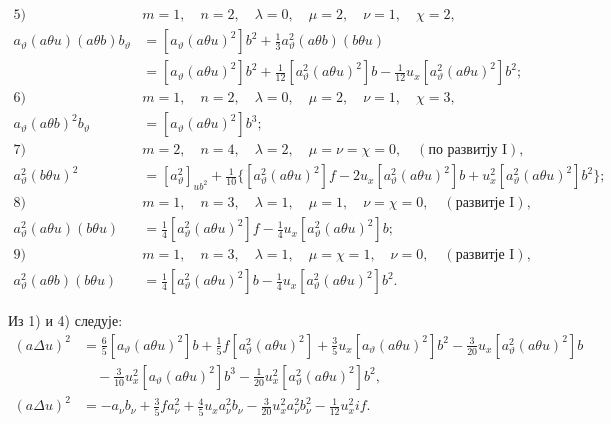 ﻿\documentclass[11pt]{article}
\begin{document}
\begin{align*}
\text{5)}\quad&m=1,\quad n=2,\quad \lambda=0,\quad \mu=2,\quad \nu=1,\quad \chi=2,\\
a_\vartheta(a\theta u)(a\theta b)b_\vartheta
&=[a_\vartheta(a\theta u)^2]b^2+\frac13a_\vartheta^2(a\theta b)(b\theta u)\\
&=[a_\vartheta(a\theta u)^2]b^2+\frac1{12}[a_\vartheta^2(a\theta u)^2]b-\frac1{12}u_x[a_\vartheta^2(a\theta u)^2]b^2;\\[.6em]
\text{6)}\quad&m=1,\quad n=2,\quad \lambda=0,\quad \mu=2,\quad \nu=1,\quad \chi=3,\\
a_\vartheta(a\theta b)^2b_\vartheta&=[a_\vartheta(a\theta u)^2]b^3;\\[.6em]
\text{7)}\quad&m=2,\quad n=4,\quad \lambda=2,\quad \mu=\nu=\chi=0,\quad (\text{по развитју I}),\\
a_\vartheta^2(b\theta u)^2&=[a_\vartheta^2]_{ub^2}+\frac1{10}\{[a_\vartheta^2(a\theta u)^2]f-2u_x[a_\vartheta^2(a\theta u)^2]b+u_x^2[a_\vartheta^2(a\theta u)^2]b^2\};\\[.6em]
\text{8)}\quad&m=1,\quad n=3,\quad \lambda=1,\quad \mu=1,\quad \nu=\chi=0,\quad (\text{развитје I}),\\
a_\vartheta^2(a\theta u)(b\theta u)&=\frac14[a_\vartheta^2(a\theta u)^2]f-\frac14u_x[a_\vartheta^2(a\theta u)^2]b;\\[.6em]
\text{9)}\quad&m=1,\quad n=3,\quad \lambda=1,\quad \mu=\chi=1,\quad \nu=0,\quad (\text{развитје I}),\\
a_\vartheta^2(a\theta b)(b\theta u)&=\frac14[a_\vartheta^2(a\theta u)^2]b-\frac14u_x[a_\vartheta^2(a\theta u)^2]b^2.
\end{align*}
\endgroup

Из 1) и 4) следује:
\begingroup\scriptsize
\[
\begin{aligned}
(a\Delta u)^2
&=\frac65[a_\vartheta(a\theta u)^2]b+\frac15f[a_\vartheta^2(a\theta u)^2]+\frac35u_x[a_\vartheta(a\theta u)^2]b^2-\frac3{20}u_x[a_\vartheta^2(a\theta u)^2]b\\
&\quad-\frac3{10}u_x^2[a_\vartheta(a\theta u)^2]b^3-\frac1{20}u_x^2[a_\vartheta^2(a\theta u)^2]b^2,\\
(a\Delta u)^2
&=-a_\nu b_\nu+\frac35fa_\nu^2+\frac45u_xa_\nu^2b_\nu-\frac3{20}u_x^2a_\nu^2b_\nu^2-\frac1{12}u_x^2if.
\end{aligned}
\]
\endgroup
\end{document}
